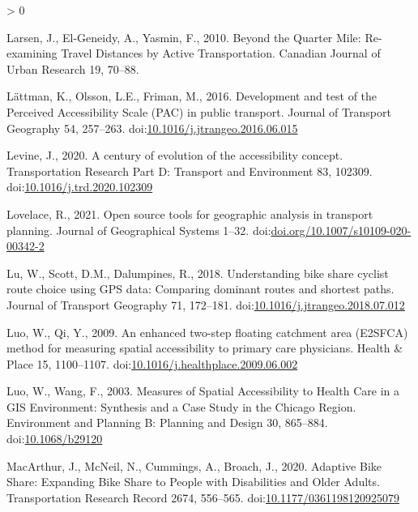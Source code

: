 \documentclass[]{elsarticle} %
\newlength{\cslhangindent}
\newenvironment{CSLReferences}[2] %
 {%
  \setlength{\parindent}{0pt}
  \ifodd #1 \everypar{\setlength{\hangindent}{\cslhangindent}}\ignorespaces\fi
  \ifnum #2 > 0
  \setlength{\parskip}{#2\baselineskip}
  \fi
 }%
 {}
\begin{document}
\begin{CSLReferences}{1}{0}
\leavevmode\hypertarget{ref-larsenQuarterMileReexamining2010}{}%
Larsen, J., El-Geneidy, A., Yasmin, F., 2010. Beyond the {Quarter Mile}:
{Re}-examining {Travel Distances} by {Active Transportation}. Canadian
Journal of Urban Research 19, 70--88.

\leavevmode\hypertarget{ref-lattmanDevelopmentTestPerceived2016}{}%
Lättman, K., Olsson, L.E., Friman, M., 2016. Development and test of the
{Perceived Accessibility Scale} ({PAC}) in public transport. Journal of
Transport Geography 54, 257--263.
doi:\href{https://doi.org/10.1016/j.jtrangeo.2016.06.015}{10.1016/j.jtrangeo.2016.06.015}

\leavevmode\hypertarget{ref-levineCenturyEvolutionAccessibility2020}{}%
Levine, J., 2020. A century of evolution of the accessibility concept.
Transportation Research Part D: Transport and Environment 83, 102309.
doi:\href{https://doi.org/10.1016/j.trd.2020.102309}{10.1016/j.trd.2020.102309}

\leavevmode\hypertarget{ref-lovelace2021open}{}%
Lovelace, R., 2021. Open source tools for geographic analysis in
transport planning. Journal of Geographical Systems 1--32.
doi:\href{https://doi.org/doi.org/10.1007/s10109-020-00342-2}{doi.org/10.1007/s10109-020-00342-2}

\leavevmode\hypertarget{ref-luUnderstandingBikeShare2018}{}%
Lu, W., Scott, D.M., Dalumpines, R., 2018. Understanding bike share
cyclist route choice using {GPS} data: {Comparing} dominant routes and
shortest paths. Journal of Transport Geography 71, 172--181.
doi:\href{https://doi.org/10.1016/j.jtrangeo.2018.07.012}{10.1016/j.jtrangeo.2018.07.012}

\leavevmode\hypertarget{ref-luoEnhancedTwostepFloating2009}{}%
Luo, W., Qi, Y., 2009. An enhanced two-step floating catchment area
({E2SFCA}) method for measuring spatial accessibility to primary care
physicians. Health \& Place 15, 1100--1107.
doi:\href{https://doi.org/10.1016/j.healthplace.2009.06.002}{10.1016/j.healthplace.2009.06.002}

\leavevmode\hypertarget{ref-luoMeasuresSpatialAccessibility2003}{}%
Luo, W., Wang, F., 2003. Measures of {Spatial Accessibility} to {Health
Care} in a {GIS Environment}: {Synthesis} and a {Case Study} in the
{Chicago Region}. Environment and Planning B: Planning and Design 30,
865--884. doi:\href{https://doi.org/10.1068/b29120}{10.1068/b29120}

\leavevmode\hypertarget{ref-macarthurAdaptiveBikeShare2020}{}%
MacArthur, J., McNeil, N., Cummings, A., Broach, J., 2020. Adaptive
{Bike Share}: {Expanding Bike Share} to {People} with {Disabilities} and
{Older Adults}. Transportation Research Record 2674, 556--565.
doi:\href{https://doi.org/10.1177/0361198120925079}{10.1177/0361198120925079}


\end{CSLReferences}
\end{document}
